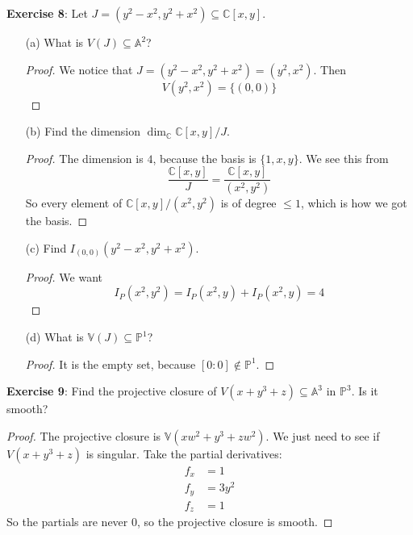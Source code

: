 \documentclass{article}
\begin{document}
\textbf{Exercise 8}: Let $J = (y^{2} - x^{2}, y^{2} + x^{2}) \subseteq \mathbb{C}[x, y]$.
    \begin{itemize}
        \item [(a)] What is $V(J) \subseteq \mathbb{A}^{2}$?
            \begin{proof}
                We notice that $J = (y^{2} - x^{2}, y^{2} + x^{2}) = (y^{2}, x^{2})$. Then 
                    \begin{equation*}
                        V(y^{2}, x^{2}) = \{(0, 0)\}
                    \end{equation*}
            \end{proof}

        \item [(b)] Find the dimension $\dim_{\mathbb{C}}\mathbb{C}[x, y]/J$.
            \begin{proof}
                The dimension is $4$, because the basis is $\{1, x, y\}$. We see this from
                    \begin{equation*}
                        \dfrac{\mathbb{C}[x, y]}{J} = \dfrac{\mathbb{C}[x, y]}{(x^{2}, y^{2})}
                    \end{equation*}
                So every element of $\mathbb{C}[x, y]/(x^{2}, y^{2})$ is of degree $\leq 1$, which is how we got the basis.
            \end{proof}

        \item [(c)] Find $I_{(0, 0)}(y^{2} - x^{2}, y^{2} + x^{2})$.
            \begin{proof}
                We want
                    \begin{equation*}
                        I_{P}(x^{2}, y^{2}) = I_{P}(x^{2}, y) + I_{P}(x^{2}, y) = 4
                    \end{equation*}
            \end{proof}

        \item [(d)] What is $\mathbb{V}(J) \subseteq \mathbb{P}^{1}$? 
            \begin{proof}
                It is the empty set, because $[0 : 0] \notin \mathbb{P}^{1}$.
            \end{proof}
    \end{itemize}

\textbf{Exercise 9}: Find the projective closure of $V(x + y^{3} + z) \subseteq \mathbb{A}^{3}$ in $\mathbb{P}^{3}$. Is it smooth?
    \begin{proof}
        The projective closure is $\mathbb{V}(xw^{2} + y^{3} + zw^{2})$. We just need to see if $V(x + y^{3} + z)$ is singular. Take the partial derivatives:
            \begin{align*}
                f_{x} &= 1      \\
                f_{y} &= 3y^{2} \\
                f_{z} &= 1        
            \end{align*}
        So the partials are never $0$, so the projective closure is smooth.
    \end{proof}
\end{document}
